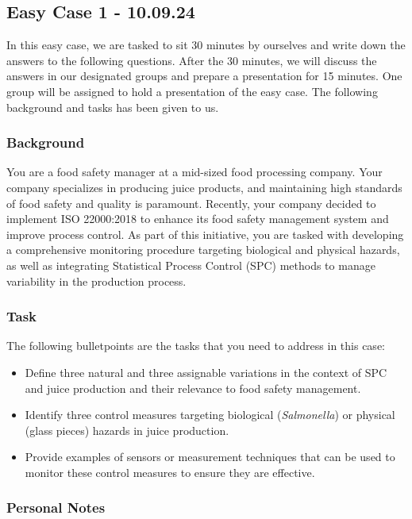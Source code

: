 \subsection{Easy Case 1 - 10.09.24}

In this easy case, we are tasked to sit 30 minutes by ourselves and write down the answers to the following questions. After the 30 minutes, we will discuss the answers in our designated groups and prepare a presentation for 15 minutes. One group will be assigned to hold a presentation of the easy case. The following background and tasks has been given to us.

\subsubsection*{Background}
You are a food safety manager at a mid-sized food processing company. Your company specializes in producing juice products, and maintaining high standards of food safety and quality is paramount. Recently, your company decided to implement ISO 22000:2018 to enhance its food safety management system and improve process control. As part of this initiative, you are tasked with developing a comprehensive monitoring procedure targeting biological and physical hazards, as well as integrating Statistical Process Control (SPC) methods to manage variability in the production process.

\subsubsection*{Task}
The following bulletpoints are the tasks that you need to address in this case:
\begin{itemize}
    \item Define three natural and three assignable variations in the context of SPC and juice production and their relevance to food safety management.
    \item Identify three control measures targeting biological (\textit{Salmonella}) or physical (glass pieces) hazards in juice production.
    \item Provide examples of sensors or measurement techniques that can be used to monitor these control measures to ensure they are effective.
\end{itemize}

\subsubsection*{Personal Notes}

